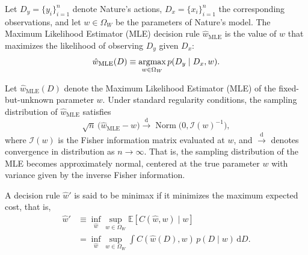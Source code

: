\begin{definition}
	\label{def:MLE}
	Let $D_y = \{y_i\}_{i=1}^n$ denote Nature’s actions, $D_x = \{x_i\}_{i=1}^n$ the corresponding observations, and let $w \in \Omega_W$ be the parameters of Nature’s model.  
	The Maximum Likelihood Estimator (MLE) decision rule $\hat{w}_{\mathrm{MLE}}$ is the value of $w$ that maximizes the likelihood of observing $D_y$ given $D_x$:
	\begin{equation}
		\hat{w}_{\mathrm{MLE}}(D) \equiv \operatorname*{argmax}_{w \in \Omega_W} p(D_y \mid D_x, w).
	\end{equation}
\end{definition}

\begin{theorem}
	\label{thm:unbiased_mle}
	Let $\hat{w}_{\mathrm{MLE}}(D)$ denote the Maximum Likelihood Estimator (MLE) of the fixed-but-unknown parameter $w$.  
	Under standard regularity conditions, the sampling distribution of $\hat{w}_{\mathrm{MLE}}$ satisfies
	\begin{equation}
		\sqrt{n}\,\big(\hat{w}_{\mathrm{MLE}} - w\big) \xrightarrow{\text{d}} \operatorname{Norm}\big(0, \mathcal{I}(w)^{-1}\big),
	\end{equation}
	where $\mathcal{I}(w)$ is the Fisher information matrix evaluated at $w$, and $\xrightarrow{\text{d}}$ denotes convergence in distribution as $n \to \infty$.  
	That is, the sampling distribution of the MLE becomes approximately normal, centered at the true parameter $w$ with variance given by the inverse Fisher information.
\end{theorem}

\begin{definition}
	\label{def:minimax}
	A decision rule $\hat{w}'$ is said to be minimax if it minimizes the maximum expected cost, that is,
	\begin{equation}
		\begin{split}
			\hat{w}' &\equiv \inf_{\hat{w}} \sup_{w \in \Omega_W} \mathbb{E}[C(\hat{w}, w) \mid w] \\
			&= \inf_{\hat{w}} \sup_{w \in \Omega_W} \int C(\hat{w}(D), w)\, p(D \mid w)\, \mathrm{d}D.
		\end{split}
	\end{equation}
\end{definition}

